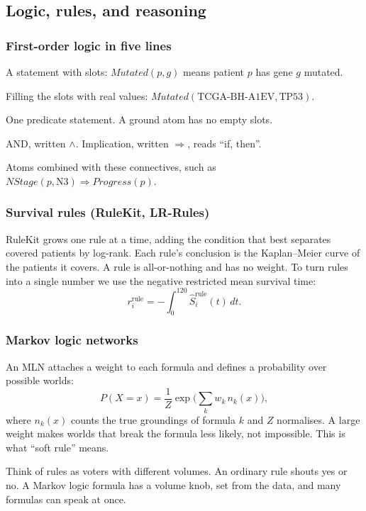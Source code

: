 \documentclass[11pt,a4paper]{article}
\newcommand{\pred}[1]{\mathit{#1}}
\begin{document}
\subsection{Logic, rules, and reasoning}

\subsubsection{First-order logic in five lines}
\begin{description}[leftmargin=0pt,labelsep=0.5em]
  \item[Predicate] A statement with slots: $\pred{Mutated}(p,g)$ means patient $p$ has gene $g$ mutated.
  \item[Grounding] Filling the slots with real values: $\pred{Mutated}(\text{TCGA-BH-A1EV},\text{TP53})$.
  \item[Atom] One predicate statement. A ground atom has no empty slots.
  \item[Conjunction] AND, written $\wedge$. Implication, written $\Rightarrow$, reads ``if, then''.
  \item[Formula] Atoms combined with these connectives, such as $\pred{NStage}(p,\mathrm{N3}) \Rightarrow \pred{Progress}(p)$.
\end{description}

\subsubsection{Survival rules (RuleKit, LR-Rules)}
RuleKit grows one rule at a time, adding the condition that best separates covered patients by log-rank. Each rule's conclusion is the Kaplan--Meier curve of the patients it covers. A rule is all-or-nothing and has no weight. To turn rules into a single number we use the negative restricted mean survival time:
\begin{equation}
r^{\text{rule}}_i=-\int_0^{120}\hat S^{\text{rule}}_i(t)\,dt.
\end{equation}

\subsubsection{Markov logic networks}
An MLN attaches a weight to each formula and defines a probability over possible worlds:
\begin{equation}
P(X=x)=\frac1Z\exp\Big(\sum_k w_k\,n_k(x)\Big),
\end{equation}
where $n_k(x)$ counts the true groundings of formula $k$ and $Z$ normalises. A large weight makes worlds that break the formula less likely, not impossible. This is what ``soft rule'' means.
\begin{plainbox}
Think of rules as voters with different volumes. An ordinary rule shouts yes or no. A Markov logic formula has a volume knob, set from the data, and many formulas can speak at once.
\end{plainbox}
\end{document}
